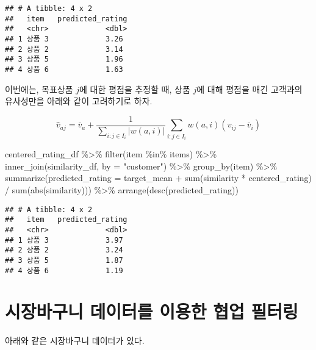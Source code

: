 \documentclass[
]{book}
\newenvironment{Shaded}{\begin{snugshade}}{\end{snugshade}}
\newcommand{\AttributeTok}[1]{\textcolor[rgb]{0.77,0.63,0.00}{#1}}
\newcommand{\FunctionTok}[1]{\textcolor[rgb]{0.00,0.00,0.00}{#1}}
\newcommand{\NormalTok}[1]{#1}
\newcommand{\SpecialCharTok}[1]{\textcolor[rgb]{0.00,0.00,0.00}{#1}}
\newcommand{\StringTok}[1]{\textcolor[rgb]{0.31,0.60,0.02}{#1}}
\begin{document}
\begin{verbatim}
## # A tibble: 4 x 2
##   item   predicted_rating
##   <chr>             <dbl>
## 1 상품 3             3.26
## 2 상품 2             3.14
## 3 상품 5             1.96
## 4 상품 6             1.63
\end{verbatim}

이번에는, 목표상품 \(j\)에 대한 평점을 추정할 때, 상품 \(j\)에 대해 평점을 매긴 고객과의 유사성만을 아래와 같이 고려하기로 하자.

\begin{equation*}
\hat{v}_{aj} = \bar{v}_a + \frac{1}{\sum_{i: j \in I_i} \left| w(a, i) \right|} \sum_{i: j \in I_i} w(a, i) (v_{ij} - \bar{v}_i)
\end{equation*}

\begin{Shaded}
\begin{Highlighting}[]
\NormalTok{centered\_rating\_df }\SpecialCharTok{\%\textgreater{}\%}
  \FunctionTok{filter}\NormalTok{(item }\SpecialCharTok{\%in\%}\NormalTok{ items) }\SpecialCharTok{\%\textgreater{}\%}
  \FunctionTok{inner\_join}\NormalTok{(similarity\_df, }\AttributeTok{by =} \StringTok{"customer"}\NormalTok{) }\SpecialCharTok{\%\textgreater{}\%}
  \FunctionTok{group\_by}\NormalTok{(item) }\SpecialCharTok{\%\textgreater{}\%}
  \FunctionTok{summarize}\NormalTok{(}\AttributeTok{predicted\_rating =}\NormalTok{ target\_mean }\SpecialCharTok{+} 
              \FunctionTok{sum}\NormalTok{(similarity }\SpecialCharTok{*}\NormalTok{ centered\_rating) }\SpecialCharTok{/} \FunctionTok{sum}\NormalTok{(}\FunctionTok{abs}\NormalTok{(similarity))) }\SpecialCharTok{\%\textgreater{}\%}
  \FunctionTok{arrange}\NormalTok{(}\FunctionTok{desc}\NormalTok{(predicted\_rating))}
\end{Highlighting}
\end{Shaded}

\begin{verbatim}
## # A tibble: 4 x 2
##   item   predicted_rating
##   <chr>             <dbl>
## 1 상품 3             3.97
## 2 상품 2             3.24
## 3 상품 5             1.87
## 4 상품 6             1.19
\end{verbatim}

\hypertarget{market-basket}{%
\section{시장바구니 데이터를 이용한 협업 필터링}\label{market-basket}}

아래와 같은 시장바구니 데이터가 있다.
\end{document}
